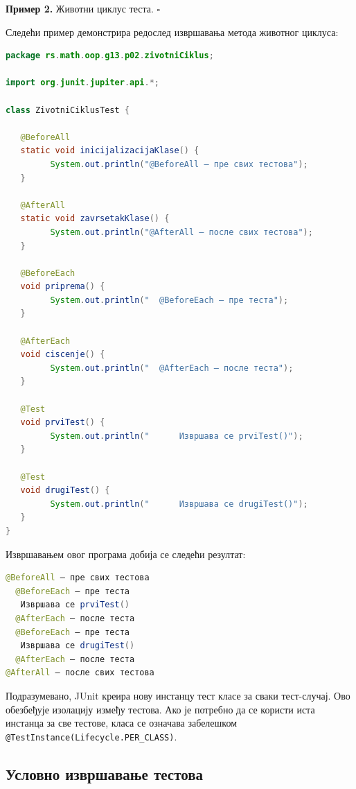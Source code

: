 \bigskip

\noindent \textbf{Пример 2.} Животни циклус теста. $\square$

\medskip

Следећи пример демонстрира редослед извршавања метода животног циклуса:


\begin{lstlisting}[language=Java]
package rs.math.oop.g13.p02.zivotniCiklus;
 
import org.junit.jupiter.api.*;
 
class ZivotniCiklusTest {
 
   @BeforeAll
   static void inicijalizacijaKlase() {
         System.out.println("@BeforeAll – пре свих тестова");
   }
 
   @AfterAll
   static void zavrsetakKlase() {
         System.out.println("@AfterAll – после свих тестова");
   }
 
   @BeforeEach
   void priprema() {
         System.out.println("  @BeforeEach – пре теста");
   }
 
   @AfterEach
   void ciscenje() {
         System.out.println("  @AfterEach – после теста");
   }
 
   @Test
   void prviTest() {
         System.out.println("      Извршава се prviTest()");
   }
 
   @Test
   void drugiTest() {
         System.out.println("      Извршава се drugiTest()");
   }
}
\end{lstlisting}


Извршавањем овог програма добија се следећи резултат:


\begin{lstlisting}[language=Java]
@BeforeAll – пре свих тестова
  @BeforeEach – пре теста
   Извршава се prviTest()
  @AfterEach – после теста
  @BeforeEach – пре теста
   Извршава се drugiTest()
  @AfterEach – после теста
@AfterAll – после свих тестова
\end{lstlisting}


Подразумевано, JUnit креира нову инстанцу тест класе за сваки тест-случај. Ово обезбеђује изолацију између тестова. Ако је потребно да се користи иста инстанца за све тестове, класа се означава забелешком \texttt{@TestInstance(Lifecycle.PER\_CLASS)}.


\subsection{Условно извршавање тестова}

